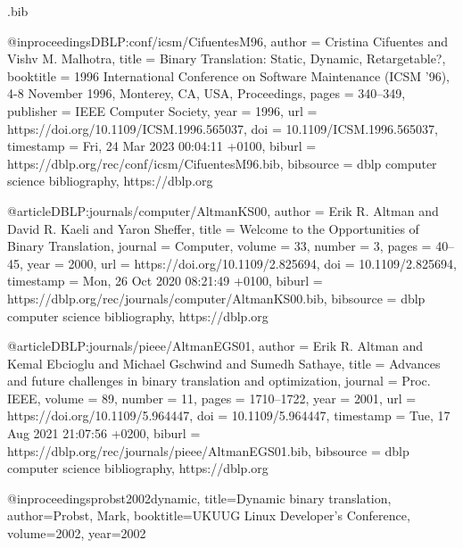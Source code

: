 \usepackage{filecontents}

\begin{filecontents}{\jobname.bib}

@inproceedings{DBLP:conf/icsm/CifuentesM96,
  author       = {Cristina Cifuentes and
                  Vishv M. Malhotra},
  title        = {Binary Translation: Static, Dynamic, Retargetable?},
  booktitle    = {1996 International Conference on Software Maintenance {(ICSM} '96),
                  4-8 November 1996, Monterey, CA, USA, Proceedings},
  pages        = {340--349},
  publisher    = {{IEEE} Computer Society},
  year         = {1996},
  url          = {https://doi.org/10.1109/ICSM.1996.565037},
  doi          = {10.1109/ICSM.1996.565037},
  timestamp    = {Fri, 24 Mar 2023 00:04:11 +0100},
  biburl       = {https://dblp.org/rec/conf/icsm/CifuentesM96.bib},
  bibsource    = {dblp computer science bibliography, https://dblp.org}
}

@article{DBLP:journals/computer/AltmanKS00,
  author       = {Erik R. Altman and
                  David R. Kaeli and
                  Yaron Sheffer},
  title        = {Welcome to the Opportunities of Binary Translation},
  journal      = {Computer},
  volume       = {33},
  number       = {3},
  pages        = {40--45},
  year         = {2000},
  url          = {https://doi.org/10.1109/2.825694},
  doi          = {10.1109/2.825694},
  timestamp    = {Mon, 26 Oct 2020 08:21:49 +0100},
  biburl       = {https://dblp.org/rec/journals/computer/AltmanKS00.bib},
  bibsource    = {dblp computer science bibliography, https://dblp.org}
}

@article{DBLP:journals/pieee/AltmanEGS01,
  author       = {Erik R. Altman and
                  Kemal Ebcioglu and
                  Michael Gschwind and
                  Sumedh Sathaye},
  title        = {Advances and future challenges in binary translation and optimization},
  journal      = {Proc. {IEEE}},
  volume       = {89},
  number       = {11},
  pages        = {1710--1722},
  year         = {2001},
  url          = {https://doi.org/10.1109/5.964447},
  doi          = {10.1109/5.964447},
  timestamp    = {Tue, 17 Aug 2021 21:07:56 +0200},
  biburl       = {https://dblp.org/rec/journals/pieee/AltmanEGS01.bib},
  bibsource    = {dblp computer science bibliography, https://dblp.org}
}

@inproceedings{probst2002dynamic,
  title={Dynamic binary translation},
  author={Probst, Mark},
  booktitle={UKUUG Linux Developer’s Conference},
  volume={2002},
  year={2002}
}


\end{filecontents}

